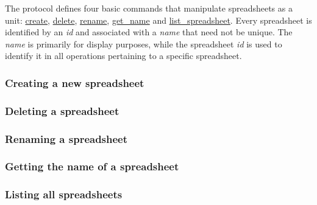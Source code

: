The protocol defines four basic commands that manipulate spreadsheets as 
a unit: \hyperref[sec:message:create]{create}, \hyperref[sec:message:delete]{delete}, 
\hyperref[sec:message:rename]{rename}, \hyperref[sec:message:get_name]{get\_name} and 
\hyperref[sec:message:list]{list\_spreadsheet}. 
Every spreadsheet is identified by an \emph{id} and associated with a \emph{name} that 
need not be unique. The \emph{name} is primarily for display purposes, while the 
spreadsheet \emph{id} is used to identify it in all operations pertaining to a 
specific spreadsheet.

\subsubsection{Creating a new spreadsheet}


\subsubsection{Deleting a spreadsheet}


\subsubsection{Renaming a spreadsheet}


\subsubsection{Getting the name of a spreadsheet}


\subsubsection{Listing all spreadsheets}
